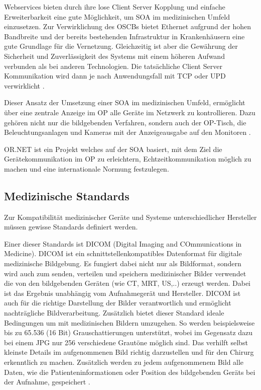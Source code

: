 Webservices bieten durch ihre lose Client Server Kopplung und einfache Erweiterbarkeit eine gute Möglichkeit, um SOA im medizinischen Umfeld einzusetzen. Zur Verwirklichung des OSCBs bietet Ethernet aufgrund der hohen Bandbreite und der bereits bestehenden Infrastruktur in Krankenhäusern eine gute Grundlage für die Vernetzung. Gleichzeitig ist aber die Gewährung der Sicherheit und Zuverlässigkeit des Systems mit einem höheren Aufwand verbunden als bei anderen Technologien.
Die tatsächliche Client Server Kommunikation wird dann je nach Anwendungsfall mit TCP oder UPD verwirklicht \cite{DerDigitaleOperationssaal}.

Dieser Ansatz der Umsetzung einer SOA im medizinischen Umfeld, ermöglicht über eine zentrale Anzeige im OP alle Geräte im Netzwerk zu kontrollieren. Dazu gehören nicht nur die bildgebenden Verfahren, sondern auch der OP-Tisch, die Beleuchtungsanlagen und Kameras mit der Anzeigeausgabe auf den Monitoren \cite{DerDigitaleOperationssaal}.

OR.NET ist ein Projekt welches auf der SOA basiert, mit dem Ziel die Gerätekommunikation im OP zu erleichtern, Echtzeitkommunikation möglich zu machen und eine internationale Normung festzulegen.

\subsection{Medizinische Standards}

Zur Kompatibilität medizinischer Geräte und Systeme unterschiedlicher Hersteller müssen gewisse Standards definiert werden.

Einer dieser Standards ist DICOM (Digital Imaging and COmmunications in Medicine). DICOM ist ein schnittstellenkompatibles Datenformat für digitale medizinische Bildgebung. Es fungiert dabei nicht nur als Bildformat, sondern wird auch zum senden, verteilen und speichern medizinischer Bilder verwendet die von den bildgebenden Geräten (wie CT, MRT, US,..) erzeugt werden. Dabei ist das Ergebnis unabhängig vom Aufnahmegerät und Hersteller. DICOM ist auch für die richtige Darstellung der Bilder verantwortlich und ermöglicht nachträgliche Bildverarbeitung.
Zusätzlich bietet dieser Standard ideale Bedingungen um mit medizinischen Bildern umzugehen. So werden beispielsweise bis zu 65.536 (16 Bit) Grauschattierungen unterstützt, wobei im Gegensatz dazu bei einem JPG nur 256 verschiedene Grautöne möglich sind. Das verhilft selbst kleinste Details im aufgenommenen Bild richtig darzustellen und für den Chirurg erkenntlich zu machen. Zusätzlich werden zu jedem aufgenommenem Bild alle Daten, wie die Patienteninformationen oder Position des bildgebenden Geräts bei der Aufnahme, gespeichert \cite{DICOM}.


